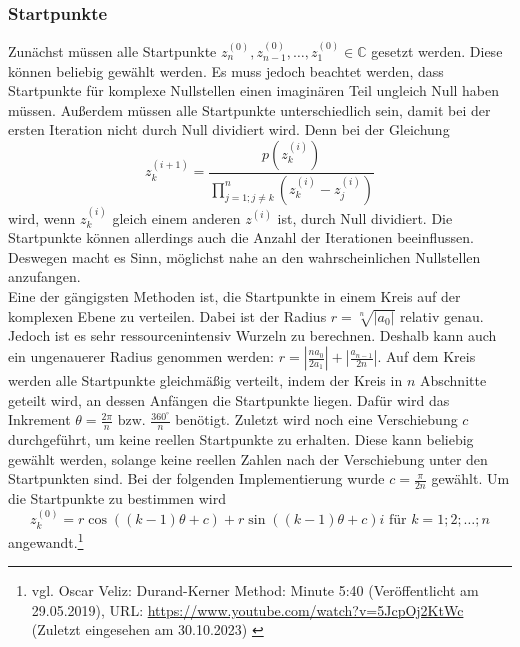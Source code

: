 \documentclass[12pt]{article}
\begin{document}
\subsubsection{Startpunkte}
Zunächst müssen alle Startpunkte $z_n^{(0)},z_{n-1}^{(0)},\dots,z_1^{(0)} \in \mathbb{C}$ gesetzt werden. Diese können beliebig gewählt werden. Es muss jedoch beachtet werden, dass Startpunkte für komplexe Nullstellen einen imaginären Teil ungleich Null haben müssen. Außerdem müssen alle Startpunkte unterschiedlich sein, damit bei der ersten Iteration nicht durch Null dividiert wird. Denn bei der Gleichung
\begin{equation*}
    z_k^{(i+1)} = \frac{p(z_{k}^{(i)})}{\prod_{j=1;j\neq k}^{n}(z_{k}^{(i)}-z_j^{(i)})}
\end{equation*}
wird, wenn $z_{k}^{(i)}$ gleich einem anderen $z^{(i)}$ ist, durch Null dividiert.
Die Startpunkte können allerdings auch die Anzahl der Iterationen beeinflussen. Deswegen macht es Sinn, möglichst nahe an den wahrscheinlichen Nullstellen anzufangen.\\
Eine der gängigsten Methoden ist, die Startpunkte in einem Kreis auf der komplexen Ebene zu verteilen. Dabei ist der Radius $r = \sqrt[n]{|a_0|}$ relativ genau. Jedoch ist es sehr ressourcenintensiv Wurzeln zu berechnen. Deshalb kann auch ein ungenauerer Radius genommen werden: $r = |\frac{na_0}{2a_1}| + |\frac{a_{n-1}}{2n}|$.
Auf dem Kreis werden alle Startpunkte gleichmäßig verteilt, indem der Kreis in $n$ Abschnitte geteilt wird, an dessen Anfängen die Startpunkte liegen. Dafür wird das Inkrement $\theta = \frac{2\pi}{n} \text{ bzw. } \frac{360^\circ}{n}$ benötigt. Zuletzt wird noch eine Verschiebung $c$ durchgeführt, um keine reellen Startpunkte zu erhalten. Diese kann beliebig gewählt werden, solange keine reellen Zahlen nach der Verschiebung unter den Startpunkten sind. Bei der folgenden Implementierung wurde $c = \frac{\pi}{2n}$ gewählt.
Um die Startpunkte zu bestimmen wird 
\[z_{k}^{(0)} = r\cos((k-1)\theta+c)+r\sin((k-1)\theta+c)i \text{ für } k=1;2;\dots;n\]
angewandt.\footnote{
    vgl. Oscar Veliz: Durand-Kerner Method: Minute 5:40 (Veröffentlicht am 29.05.2019), URL: \url{https://www.youtube.com/watch?v=5JcpOj2KtWc} (Zuletzt eingesehen am 30.10.2023) \label{ftn:OscarVilez,5:40}
}
\end{document}
